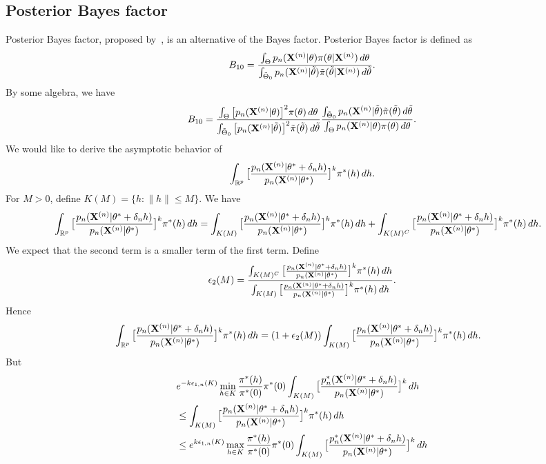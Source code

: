 \documentclass[3p]{elsarticle}
\theoremstyle{plain}
\theoremstyle{definition}
\theoremstyle{remark}
\begin{document}
\subsection{Posterior Bayes factor}
Posterior Bayes factor, proposed by~\cite{Aitkin1991Posterior}, is an alternative of the Bayes factor. Posterior Bayes factor is defined as
$$
B_{10}=\frac{\int_{\Theta}p_n(\mathbf{X}^{(n)}|\theta)\pi(\theta|\mathbf{X}^{(n)})\, d\theta}{\int_{\tilde{\Theta}_0} p_n(\mathbf{X}^{(n)}|\tilde{\theta})\tilde{\pi}(\tilde{\theta}|\mathbf{X}^{(n)})\,d\tilde{\theta}}
.
$$
By some algebra, we have
$$
B_{10}
=
\frac{\int_{\Theta}\big[p_n(\mathbf{X}^{(n)}|\theta)\big]^2\pi(\theta)\, d\theta}{\int_{\tilde{\Theta}_0} \big[p_n(\mathbf{X}^{(n)}|\tilde{\theta})\big]^2\tilde{\pi}(\tilde{\theta})\,d\tilde{\theta}}
\frac{\int_{\tilde{\Theta}_0} p_n(\mathbf{X}^{(n)}|\tilde{\theta})\tilde{\pi}(\tilde{\theta})\,d\tilde{\theta}}{\int_{\Theta}p_n(\mathbf{X}^{(n)}|\theta)\pi(\theta)\, d\theta}
.
$$
We would like to derive the asymptotic behavior of
$$
\int_{\mathbb{R}^p}\big[\frac{p_n(\mathbf{X}^{(n)}|\theta^*+\delta_n h)}{p_n(\mathbf{X}^{(n)}|\theta^*)}\big]^k \pi^*(h) \, dh.
$$
For $M>0$, define $K(M)=\{h: \|h\|\leq M\}$. We have
$$
\begin{aligned}
    &\int_{\mathbb{R}^p}\big[\frac{p_n(\mathbf{X}^{(n)}|\theta^*+\delta_n h)}{p_n(\mathbf{X}^{(n)}|\theta^*)}\big]^k \pi^*(h) \, dh
=
    \int_{K(M)}\big[\frac{p_n(\mathbf{X}^{(n)}|\theta^*+\delta_n h)}{p_n(\mathbf{X}^{(n)}|\theta^*)}\big]^k \pi^*(h) \, dh
    +
    \int_{K(M)^C}\big[\frac{p_n(\mathbf{X}^{(n)}|\theta^*+\delta_n h)}{p_n(\mathbf{X}^{(n)}|\theta^*)}\big]^k \pi^*(h) \, dh
    .
\end{aligned}
$$
We expect that the second term is a smaller term of the first term.
Define
$$
\epsilon_{2}(M)=
\frac{
    \int_{K(M)^C}\big[\frac{p_n(\mathbf{X}^{(n)}|\theta^*+\delta_n h)}{p_n(\mathbf{X}^{(n)}|\theta^*)}\big]^k \pi^*(h) \, dh
}{
    \int_{K(M)}\big[\frac{p_n(\mathbf{X}^{(n)}|\theta^*+\delta_n h)}{p_n(\mathbf{X}^{(n)}|\theta^*)}\big]^k \pi^*(h) \, dh
}.
$$
Hence
$$
\begin{aligned}
    &\int_{\mathbb{R}^p}\big[\frac{p_n(\mathbf{X}^{(n)}|\theta^*+\delta_n h)}{p_n(\mathbf{X}^{(n)}|\theta^*)}\big]^k \pi^*(h) \, dh
=
    (1+\epsilon_2(M))\int_{K(M)}\big[\frac{p_n(\mathbf{X}^{(n)}|\theta^*+\delta_n h)}{p_n(\mathbf{X}^{(n)}|\theta^*)}\big]^k \pi^*(h) \, dh
    .
\end{aligned}
$$
But
$$
\begin{aligned}
    &
e^{-k\epsilon_{1,n}(K)}
    \min_{h\in K} \frac{\pi^*(h)}{\pi^*(0)}
    \pi^*(0)
    \int_{K(M)}\big[\frac{p_n^*(\mathbf{X}^{(n)}|\theta^*+\delta_n h)}{p_n(\mathbf{X}^{(n)}|\theta^*)}\big]^k  \, dh
    \\
    &
\leq
\int_{K(M)}\big[\frac{p_n(\mathbf{X}^{(n)}|\theta^*+\delta_n h)}{p_n(\mathbf{X}^{(n)}|\theta^*)}\big]^k \pi^*(h) \, dh
    \\
    &
\leq
e^{k\epsilon_{1,n}(K)}
    \max_{h\in K} \frac{\pi^*(h)}{\pi^*(0)}
    \pi^*(0)
    \int_{K(M)}\big[\frac{p_n^*(\mathbf{X}^{(n)}|\theta^*+\delta_n h)}{p_n(\mathbf{X}^{(n)}|\theta^*)}\big]^k \, dh
\end{aligned}
$$
\end{document}

